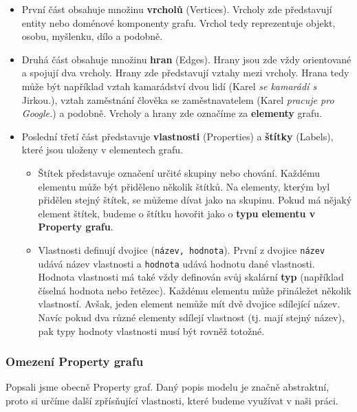 \begin{itemize}
\item První část obsahuje množinu \textbf{vrcholů} (Vertices).
Vrcholy zde představují entity nebo doménové komponenty grafu.
Vrchol tedy reprezentuje objekt, osobu, myšlenku, dílo a podobně.

\item Druhá část obsahuje množinu \textbf{hran} (Edges).
Hrany jsou zde vždy orientované a spojují dva vrcholy.
Hrany zde představují vztahy mezi vrcholy.
Hrana tedy může být například vztah kamarádství dvou lidí (Karel \textit{se kamarádí s} Jirkou.), vztah zaměstnání člověka se zaměstnavatelem (Karel \textit{pracuje pro Google.}) a podobně.
Vrcholy a hrany zde označíme za \textbf{elementy} grafu.
\item Poslední třetí část představuje \textbf{vlastnosti} (Properties) a \textbf{štítky} (Labels), které jsou uloženy v elementech grafu.

\begin{itemize}
\item
Štítek představuje označení určité skupiny nebo chování.
Každému elementu může být přiděleno několik štítků.
Na elementy, kterým byl přidělen stejný štítek, se můžeme dívat jako na skupinu.
Pokud má nějaký element štítek, budeme o štítku hovořit jako o \textbf{typu elementu v Property grafu}.

\item
Vlastnosti definují dvojice (\texttt{název, hodnota}).
První z dvojice \texttt{název} udává název vlastnosti a \texttt{hodnota} udává hodnotu dané vlastnosti.
Hodnota vlastnosti má také vždy definován svůj skalární \textbf{typ} (například číselná hodnota nebo řetězec).
Každému elementu může přináležet několik vlastností.
Avšak, jeden element nemůže mít dvě dvojice sdílející název.
Navíc pokud dva různé elementy sdílejí vlastnost (tj. mají stejný název), pak typy hodnoty vlastnosti musí být rovněž totožné.
\end{itemize}
\end{itemize}

\subsubsection{Omezení Property grafu}
Popsali jsme obecně Property graf.
Daný popis modelu je značně abstraktní, proto si určíme další zpřísňující vlastnosti, které budeme využívat v naši práci.

